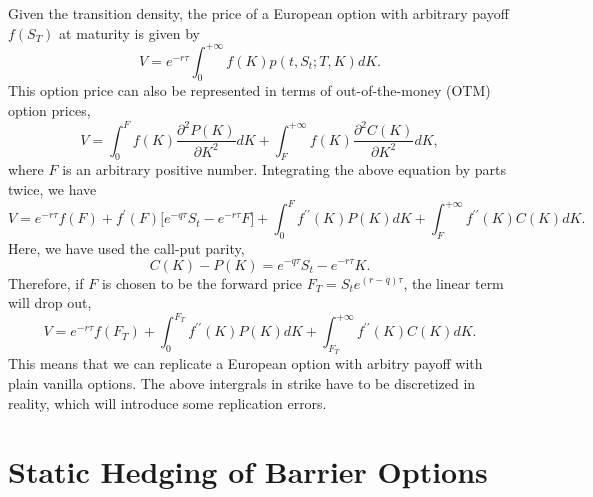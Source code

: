 \documentclass[12pt]{article}
\begin{document}
  Given the transition density, the price of a European option with arbitrary payoff $f(S_T)$ at maturity is given by
  \begin{equation}
    V = e^{-r\tau}\int_{0}^{+\infty}f(K)p(t,S_t;T,K)dK.
  \end{equation}
  This option price can also be represented in terms of out-of-the-money (OTM) option prices,
  \begin{equation}
    V = \int_{0}^{F}f(K)\frac{\partial^2P(K)}{\partial K^2}dK + \int_{F}^{+\infty}f(K)\frac{\partial^2C(K)}{\partial K^2}dK,
  \end{equation}
  where $F$ is an arbitrary positive number. Integrating the above equation by parts twice, we have
  \begin{equation}
    V = e^{-r\tau}f(F) + f^{\prime}(F)\big[e^{-q\tau}S_t-e^{-r\tau}F\big] +
           \int_{0}^{F}f^{\prime\prime}(K)P(K)dK + \int_{F}^{+\infty}f^{\prime\prime}(K)C(K)dK.
  \end{equation}
  Here, we have used the call-put parity,
  \begin{equation}
    C(K) - P(K) = e^{-q\tau}S_t-e^{-r\tau}K.
  \end{equation}
  Therefore, if $F$ is chosen to be the forward price $F_T=S_te^{(r-q)\tau}$, the linear term will drop out,
  \begin{equation}
    V = e^{-r\tau}f(F_T) +
           \int_{0}^{F_T}f^{\prime\prime}(K)P(K)dK + \int_{F_T}^{+\infty}f^{\prime\prime}(K)C(K)dK.
  \end{equation}
  This means that we can replicate a European option with arbitry payoff with plain vanilla options. The above intergrals in
  strike have to be discretized in reality, which will introduce some replication errors.


\section{Static Hedging of Barrier Options}
\end{document}
